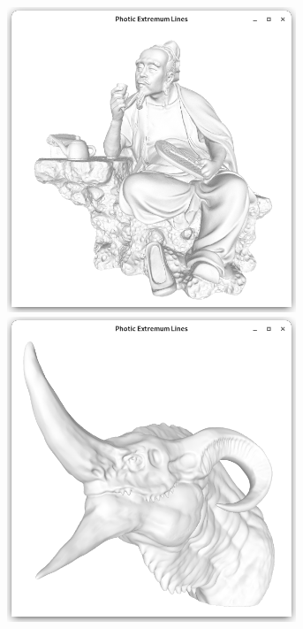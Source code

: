 \documentclass[9pt,fleqn,twoside,twocolumn]{stdglobal}
\begin{document}
\begin{figure}
\begin{subfigure}[t]{0.19\textwidth}
        \includegraphics[width=0.95\textwidth,trim={15px 15 15 50},clip]{images/results/luyu.png}
        \includegraphics[width=0.95\textwidth,trim={15px 15 15 50},clip]{images/results/dragon-head.png}

\end{subfigure}
\end{figure}
\end{document}
